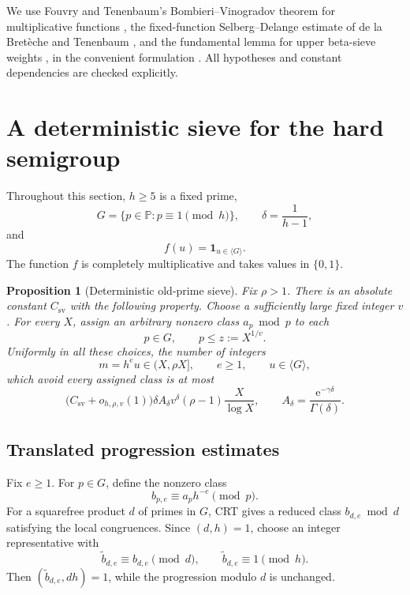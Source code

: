 \documentclass[10pt]{amsart}
\numberwithin{equation}{section}
\newcommand{\PP}{\mathbb P}
\newcommand{\Gsem}{\langle G\rangle}
\newcommand{\ind}{\mathbf 1}
\newcommand{\e}{\mathrm e}
\newtheorem{proposition}[theorem]{Proposition}
\theoremstyle{remark}
\begin{document}
We use Fouvry and Tenenbaum's Bombieri--Vinogradov theorem for
multiplicative functions \cite[Definition 1.1 and Theorem 1.8]{FouvryTenenbaum},
the fixed-function Selberg--Delange estimate of de la Bret\`eche and
Tenenbaum \cite[Theorem 2.1]{BretècheTenenbaum}, and the fundamental lemma
for upper beta-sieve weights \cite[Lemma 6.11]{FriedlanderIwaniec}, in the
convenient formulation \cite[(2.5)--(2.6), Theorem 2.2]{KurlbergEtAl}.
All hypotheses and constant dependencies are checked explicitly.

\section{A deterministic sieve for the hard semigroup}

Throughout this section, \(h\ge5\) is a fixed prime,
\[
 G=\{p\in\PP:p\equiv1\pmod h\},
 \qquad
 \delta=\frac1{h-1},
\]
and
\[
 f(u)=\ind_{u\in\Gsem}.
\]
The function \(f\) is completely multiplicative and takes values in
\(\{0,1\}\).

\begin{proposition}[Deterministic old-prime sieve]\label{prop:sieve}
Fix \(\rho>1\). There is an absolute constant \(C_{\mathrm{sv}}\) with the
following property. Choose a sufficiently large fixed integer \(v\). For
every \(X\), assign an arbitrary nonzero class \(a_p\bmod p\) to each
\[
 p\in G,\qquad p\le z:=X^{1/v}.
\]
Uniformly in all these choices, the number of integers
\[
 m=h^e u\in(X,\rho X],\qquad e\ge1,\qquad u\in\Gsem,
\]
which avoid every assigned class is at most
\begin{equation}\label{eq:main-sieve}
 \bigl(C_{\mathrm{sv}}+o_{h,\rho,v}(1)\bigr)
 \delta A_\delta v^\delta(\rho-1)\frac X{\log X},
 \qquad
 A_\delta=\frac{\e^{-\gamma\delta}}{\Gamma(\delta)}.
\end{equation}
\end{proposition}

\subsection{Translated progression estimates}

Fix \(e\ge1\). For \(p\in G\), define the nonzero class
\begin{equation}\label{eq:bpe}
 b_{p,e}\equiv a_p h^{-e}\pmod p.
\end{equation}
For a squarefree product \(d\) of primes in \(G\), CRT gives a reduced class
\(b_{d,e}\bmod d\) satisfying the local congruences. Since \((d,h)=1\),
choose an integer representative with
\begin{equation}\label{eq:btilde}
 \widetilde b_{d,e}\equiv b_{d,e}\pmod d,
 \qquad
 \widetilde b_{d,e}\equiv1\pmod h.
\end{equation}
Then \((\widetilde b_{d,e},dh)=1\), while the progression modulo \(d\) is
unchanged.
\end{document}
